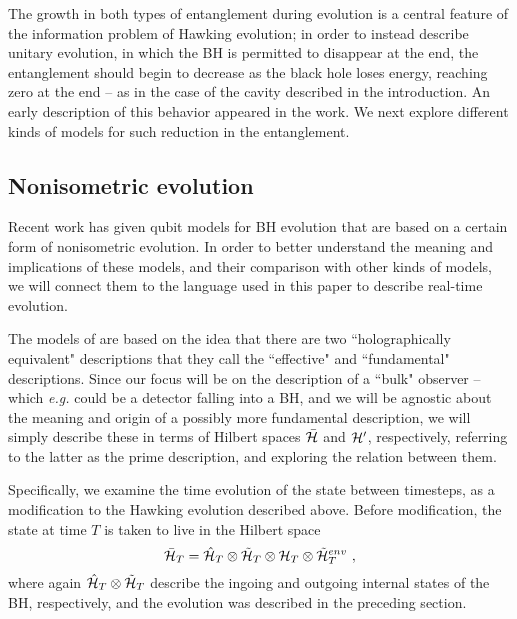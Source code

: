 \documentclass[12pt]{article}
\numberwithin{equation}{section}
\newcommand{\calh}{{\cal H}}
\newcommand{\beq}{\begin{equation}}
\newcommand{\eeq}{\end{equation}}
\begin{document}
The growth in both types of entanglement during evolution is a central feature of the information problem of Hawking evolution; in order to instead describe unitary evolution, in which the BH is permitted to disappear at the end, the entanglement should begin to decrease as the black hole loses energy, reaching zero at the end -- as in the case of the cavity described in the introduction.  An early description of this behavior appeared in the work\cite{Pageone,Pagetwo}.  We next explore different kinds of models for such reduction in the entanglement.


\subsection{Nonisometric evolution}

Recent work\cite{AEHPV} has given qubit models for BH evolution that are based on a certain form of nonisometric evolution.  In order to better understand the meaning and implications of these models, and their comparison with other kinds of models, we will connect them to the language used in this paper to describe real-time evolution.

The models of \cite{AEHPV} are based on the idea that there are two ``holographically equivalent" descriptions that they call the ``effective" and ``fundamental" descriptions.  Since our focus will be on the description of a ``bulk" observer -- which {\it e.g.} could be a detector falling into a BH, and we will be agnostic about the meaning and origin of a possibly more fundamental description, we will simply describe these in terms of Hilbert spaces $\bar \calh$ and $\calh'$, respectively, referring to the latter as the prime description, and exploring the relation between them.

Specifically, we examine the time evolution of the state between timesteps, as a modification to the Hawking evolution described above.  Before modification, the state at time $T$ is taken to live in the Hilbert space 
\beq
\bar \calh_T = \hat\calh_T \otimes \tilde \calh_T  \otimes \calh_T\otimes \tilde \calh^{env}_T\ ,
\eeq
where again $\hat\calh_T \otimes \tilde \calh_T$ describe the ingoing and outgoing internal states of the BH, respectively, and the evolution was described in the preceding section.
\end{document}
